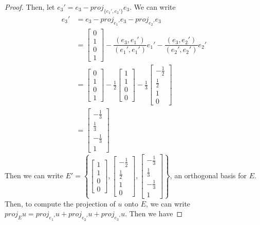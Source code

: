 \documentclass{article}
\begin{document}
\begin{proof}
Then, let $e_3' = e_3 - proj_{\{e_1',e_2'\}}e_3$. We can write 
\begin{align*}
e_3' & = e_3 - proj_{e_1'}e_3 - proj_{e_2'}e_3 \\
& = \begin{bmatrix}0\\1\\0\\1\end{bmatrix} - \dfrac{(e_3, e_1')}{(e_1',e_1')}e_1' - \dfrac{(e_3, e_2')}{(e_2',e_2')}e_2' \\
& = \begin{bmatrix}0\\1\\0\\1\end{bmatrix} - \frac{1}{2}\begin{bmatrix}1\\1\\0\\0\end{bmatrix} - \frac{1}{3}\begin{bmatrix}-\frac{1}{2}\\ \frac{1}{2} \\ 1 \\ 0\end{bmatrix} \\
& = \begin{bmatrix}-\frac{1}{3}\\ \frac{1}{3} \\ -\frac{1}{3} \\ 1 \end{bmatrix}
\end{align*}
Then we can write $E' = \left\{ \begin{bmatrix}1\\1\\0\\0\end{bmatrix}, \begin{bmatrix}-\frac{1}{2}\\ \frac{1}{2} \\ 1 \\ 0 \end{bmatrix}, \begin{bmatrix}-\frac{1}{3} \\ \frac{1}{3} \\ -\frac{1}{3} \\ 1 \end{bmatrix} \right\}$, an orthogonal basis for $E$. Then, to compute the projection of $u$ onto $E$, we can write $proj_{E}u = proj_{e_1'}u + proj_{e_2'}u + proj_{e_3'}u$. Then we have 

\end{proof}
\end{document}
